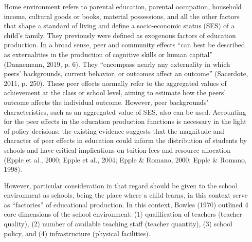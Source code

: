 \documentclass[
]{article}
\begin{document}
Home environment refers to parental education, parental occupation,
household income, cultural goods or books, material possessions, and all
the other factors that shape a standard of living and define a
socio-economic status (SES) of a child's family. They previously were
defined as exogenous factors of education production. In a broad sense,
peer and community effects ``can best be described as externalities in
the production of cognitive skills or human capital'' (Dannemann, 2019,
p. 6). They ``encompass nearly any externality in which peers'
backgrounds, current behavior, or outcomes affect an outcome''
(Sacerdote, 2011, p. 250). These peer effects normally refer to the
aggregated values of achievement at the class or school level, aiming to
estimate how the peers' outcome affects the individual outcome. However,
peer backgrounds' characteristics, such as an aggregated value of SES,
also can be used. Accounting for the peer effects in the education
production functions is necessary in the light of policy decisions: the
existing evidence suggests that the magnitude and character of peer
effects in education could inform the distribution of students by
schools and have critical implications on tuition fees and resource
allocation (Epple et al., 2000; Epple et al., 2004; Epple \& Romano,
2000; Epple \& Romano, 1998).

However, particular consideration in that regard should be given to the
school environment as schools, being the place where a child learns, in
this context serve as ``factories'' of educational production. In this
context, Bowles (1970) outlined 4 core dimensions of the school
environment: (1) qualification of teachers (teacher quality), (2) number
of available teaching staff (teacher quantity), (3) school policy, and
(4) infrastructure (physical facilities).
\end{document}
